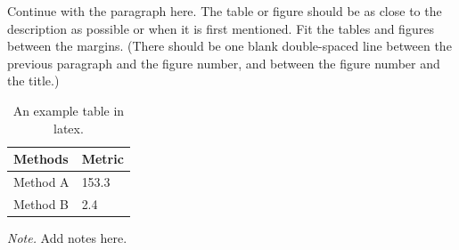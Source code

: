 Continue with the paragraph here.  The table or figure should be as close to the description as possible or when it is first mentioned. Fit the tables and figures between the margins.
(There should be one blank double-spaced line between the previous paragraph and the figure number, and between the figure number and the title.)

\begin{table}[]
\caption{An example table in latex.}
\begin{center}
\begin{tabular}{l l}
\hline
    Methods & Metric\\ \hline
Method A      & 153.3                \\ 
Method B & 2.4                  \\ \hline
\end{tabular}
\label{tab:dense}
\end{center}
\small{\textit{Note.} Add notes here.}
\end{table}
